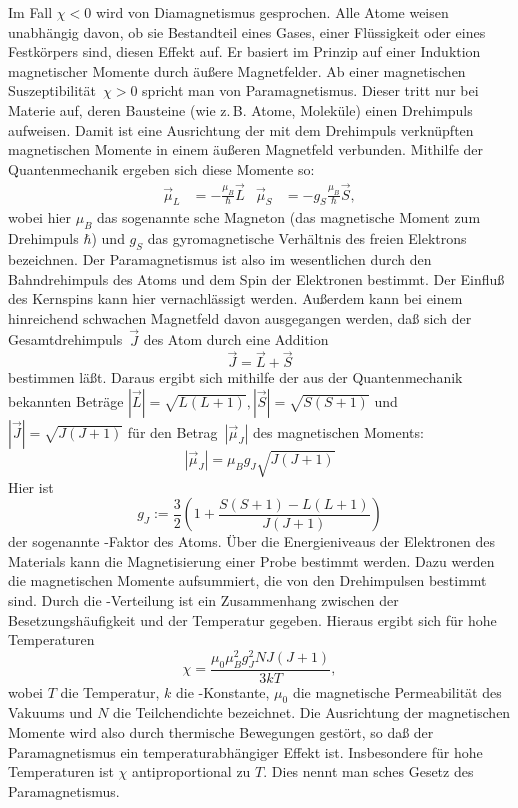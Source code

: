 Im Fall $\chi < 0$ wird von Diamagnetismus gesprochen.  Alle Atome
weisen unabhängig davon, ob sie Bestandteil eines Gases, einer
Flüssigkeit oder eines Festkörpers sind, diesen Effekt auf.  Er basiert
im Prinzip auf einer Induktion magnetischer Momente durch äußere
Magnetfelder.  Ab einer magnetischen Suszeptibilität~$\chi>0$ spricht
man von Paramagnetismus.  Dieser tritt nur bei Materie auf, deren
Bausteine (wie z.\,B. Atome, Moleküle) einen Drehimpuls aufweisen.
Damit ist eine Ausrichtung der mit dem Drehimpuls verknüpften
magnetischen Momente in einem äußeren Magnetfeld verbunden.  Mithilfe
der Quantenmechanik ergeben sich diese Momente so:
\begin{align}
  \vec\mu_L &= -\frac{\mu_B}{\hbar} \vec{L} &
  \vec\mu_S &= -g_S\frac{\mu_B}{\hbar} \vec{S},
\end{align}
wobei hier $\mu_B$ das sogenannte sche Magneton (das
magnetische Moment zum Drehimpuls $\hbar$) und $g_S$ das gyromagnetische
Verhältnis des freien Elektrons bezeichnen.  Der Paramagnetismus ist
also im wesentlichen durch den Bahndrehimpuls des Atoms und dem Spin der
Elektronen bestimmt.  Der Einfluß des Kernspins kann hier vernachlässigt
werden.  Außerdem kann bei einem hinreichend schwachen Magnetfeld davon
ausgegangen werden, daß sich der Gesamtdrehimpuls~$\vec{J}$ des Atom
durch eine Addition
\begin{equation}
  \vec{J} = \vec{L} + \vec{S}
\end{equation}
bestimmen läßt.  Daraus ergibt sich mithilfe der aus der Quantenmechanik
bekannten Beträge $|\vec{L}| = \sqrt{L(L + 1)}, |\vec{S}| = \sqrt{S(S +
  1)}$ und $|\vec{J}| = \sqrt{J(J+1)}$ für den Betrag~$|\vec{\mu}_J|$
des magnetischen Moments:
\begin{equation}
  |\vec{\mu}_J| = \mu_B g_J \sqrt{J(J + 1)}
\end{equation}
Hier ist
\begin{equation}
g_J := \frac{3}{2} \left(1 + \frac{S(S + 1) - L(L+1)}{J(J + 1)}\right)
\end{equation}
der sogenannte -Faktor des Atoms.  Über die Energieniveaus
der Elektronen des Materials kann die Magnetisierung einer Probe
bestimmt werden.  Dazu werden die magnetischen Momente aufsummiert, die
von den Drehimpulsen bestimmt sind.  Durch die
-Verteilung ist ein Zusammenhang zwischen der
Besetzungshäufigkeit und der Temperatur gegeben.  Hieraus ergibt sich
für hohe Temperaturen
\begin{equation}
  \label{eq:curie-gesetz}
  \chi = \frac{\mu_0 \mu_B^2 g_J^2 N J(J + 1)}{3 k T},
\end{equation}
wobei $T$ die Temperatur, $k$ die -Konstante, $\mu_0$
die magnetische Permeabilität des Vakuums und $N$ die Teilchendichte
bezeichnet.  Die Ausrichtung der magnetischen Momente wird also durch
thermische Bewegungen gestört, so daß der Paramagnetismus ein
temperaturabhängiger Effekt ist.  Insbesondere für hohe Temperaturen ist
$\chi$ antiproportional zu $T$.  Dies nennt man sches Gesetz
des Paramagnetismus.

